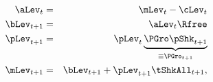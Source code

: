 \begin{eqnarray}
\aLev_{t}   &=&\mLev_{t}-\cLev_{t}  \label{eq:DBCparts} \\
\bLev_{t+1}   & = & \aLev_{t} \Rfree \notag \\
\pLev_{t+1} &=&\pLev_{t} \underbrace{\PGro\pShk_{t+1}}_{\equiv \PGro_{t+1}}  \notag \\
%
\mLev_{t+1} &=& \bLev_{t+1} +\pLev_{t+1}\tShkAll_{t+1},  \notag
\end{eqnarray}

